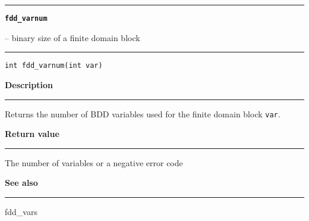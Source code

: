 \begin{minipage}{\textwidth}

\noindent\begin{minipage}{\textwidth}
\rule{\textwidth}{0.5mm}
{\tt\bf fdd\_varnum }
\--- binary size of a finite domain block  \hspace{\fill}
\\\rule[1.5ex]{\textwidth}{0.5mm}
\end{minipage}

\noindent\begin{verbatim}
int fdd_varnum(int var) 
\end{verbatim}

\vspace{\parsep}\noindent
{\bf Description}\\\rule[1.5ex]{\textwidth}{0.2mm}\vspace{-1.5ex}\setlength{\parindent}{1em}
Returns the number of BDD variables used for the finite domain
           block {\tt var}. 

\setlength{\parindent}{0em}\vspace{\parsep}\vspace{\baselineskip}\noindent
{\bf Return value}\\\rule[1.5ex]{\textwidth}{0.2mm}\vspace{-1.5ex}
The number of variables or a negative error code 

\vspace{\parsep}\vspace{\baselineskip}\noindent
{\bf See also}\\\rule[1.5ex]{\textwidth}{0.2mm}\vspace{-1.5ex}
fdd\_vars 
\end{minipage}
\vspace{8ex}
